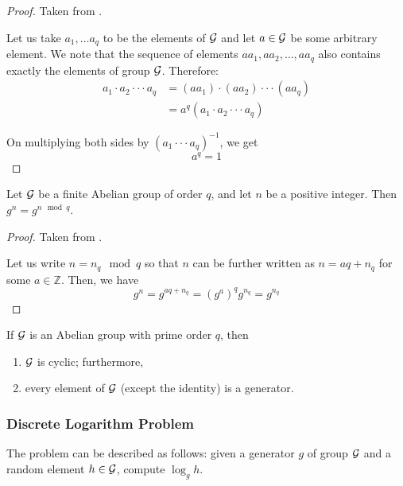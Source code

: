 \begin{proof}

Taken from \cite{koocmsc}.

Let us take $ a_1, \ldots a_q $ to be the elements of $\mathcal{G}$ and let $ a \in \mathcal{G} $ be some arbitrary element. We note that the sequence of elements $ aa_1, aa_2, \ldots , aa_q $ also contains exactly the elements of group $ \mathcal{G} $. Therefore:
\begin{equation*}
\begin{split}
a_1 \cdot a_2 \cdot \cdot \cdot a_q
&= (aa_1) \cdot (aa_2) \cdot \cdot \cdot (aa_q)\\
&= a^q (a_1 \cdot a_2 \cdot \cdot \cdot a_q)
\end{split}
\end{equation*}

On multiplying both sides by $ (a_1 \cdot \cdot \cdot a_q)^{-1} $, we get 
\begin{equation*}
a^q = 1
\end{equation*}
\end{proof}
\begin{corollary}
Let $ \mathcal{G} $ be a finite Abelian group of order $ q $, and let $ n $ be a positive integer.
Then $ g^n = g^{n \mod q} $.
\end{corollary}
\begin{proof}

Taken from \cite{koocmsc}.

Let us write $ n = n_q \mod q $ so that $ n $ can be further written as $ n = aq + n_q $ for some $ a \in \mathbb{Z} $. Then, we have
\begin{equation*}
g^n = g^{aq+n_q} = (g^a)^q g^{n_q} = g^{n_q}
\end{equation*}
\end{proof}
\begin{lemma}
If $ \mathcal{G} $ is an Abelian group with prime order $ q $, then 
\begin{enumerate}
    \item $ \mathcal{G} $ is cyclic; furthermore,
    \item every element of $ \mathcal{G} $ (except the identity) is a generator.
\end{enumerate}
\end{lemma}
\subsubsection{Discrete Logarithm Problem}
The problem can be described as follows: given a generator $ g $ of group $ \mathcal{G} $ and a random element $ h \in \mathcal{G} $, compute $ \log_g h $.

